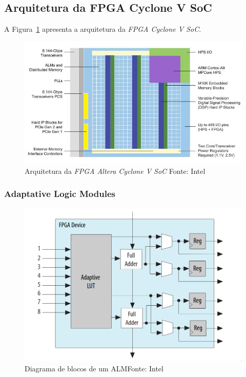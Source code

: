     \subsection{Arquitetura da FPGA Cyclone V SoC}
    {
        A Figura~\ref{fig:cyclone_v_arch} apresenta a arquitetura da
        \textit{FPGA Cyclone V SoC}.
    }

    \begin{figure}[H]
    \centering
    \includegraphics[width=1\linewidth]
        {../images/altera_cyclone_v_soc_architectural_downscale.jpg}
        \caption[Arquitetura da FPGA Intel Cyclone V SoC]
            {Arquitetura da \textit{FPGA Altera Cyclone V SoC} \quad Fonte: Intel}
        \label{fig:cyclone_v_arch}
    \end{figure}

        \subsubsection{Adaptative Logic Modules}
        {}

        \begin{figure}[H]
        \centering
        \includegraphics[width=1\linewidth]
            {../images/intel_alm_high_level.png}
            \caption[Diagrama de blocos de um ALM]
                {Diagrama de blocos de um ALM\quad Fonte: Intel}
            \label{fig:fpga_alm}
        \end{figure}


